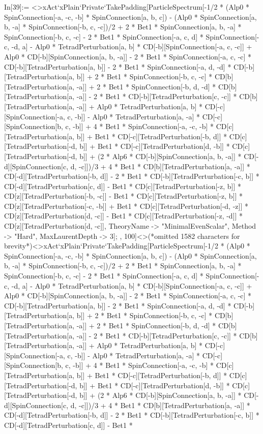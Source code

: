 In[39]:= <>xAct`xPlain`Private`TakePadding[ParticleSpectrum[-1/2 * (Alp0 * SpinConnection[-a, -c, -b] * SpinConnection[a, b, c]) - (Alp0 * SpinConnection[a, b, -a] * SpinConnection[-b, c, -c])/2 + 2 * Bet1 * SpinConnection[a, b, -a] * SpinConnection[-b, c, -c] - 2 * Bet1 * SpinConnection[-a, c, d] * SpinConnection[-c, -d, a] - Alp0 * TetradPerturbation[a, b] * CD[-b][SpinConnection[-a, c, -c]] + Alp0 * CD[-b][SpinConnection[a, b, -a]] - 2 * Bet1 * SpinConnection[-a, c, -c] * CD[-b][TetradPerturbation[a, b]] - 2 * Bet1 * SpinConnection[-a, d, -d] * CD[-b][TetradPerturbation[a, b]] + 2 * Bet1 * SpinConnection[-b, c, -c] * CD[b][TetradPerturbation[a, -a]] + 2 * Bet1 * SpinConnection[-b, d, -d] * CD[b][TetradPerturbation[a, -a]] - 2 * Bet1 * CD[-b][TetradPerturbation[c, -c]] * CD[b][TetradPerturbation[a, -a]] + Alp0 * TetradPerturbation[a, b] * CD[-c][SpinConnection[-a, c, -b]] - Alp0 * TetradPerturbation[a, -a] * CD[-c][SpinConnection[b, c, -b]] + 4 * Bet1 * SpinConnection[-a, -c, -b] * CD[c][TetradPerturbation[a, b]] + Bet1 * CD[-c][TetradPerturbation[-b, d]] * CD[c][TetradPerturbation[-d, b]] + Bet1 * CD[-c][TetradPerturbation[d, -b]] * CD[c][TetradPerturbation[-d, b]] + (2 * Alp6 * CD[-b][SpinConnection[a, b, -a]] * CD[-d][SpinConnection[c, d, -c]])/3 + 4 * Bet1 * CD[b][TetradPerturbation[a, -a]] * CD[-d][TetradPerturbation[-b, d]] - 2 * Bet1 * CD[-b][TetradPerturbation[-c, b]] * CD[-d][TetradPerturbation[c, d]] - Bet1 * CD[c][TetradPerturbation[-z, b]] * CD[z][TetradPerturbation[-b, -c]] - Bet1 * CD[c][TetradPerturbation[-z, b]] * CD[z][TetradPerturbation[-c, -b]] + Bet1 * CD[c][TetradPerturbation[-d, -z]] * CD[z][TetradPerturbation[d, -c]] - Bet1 * CD[c][TetradPerturbation[-z, -d]] * CD[z][TetradPerturbation[d, -c]], TheoryName -> "MinimalEvenScalar", Method -> "Hard", MaxLaurentDepth -> 3]; , 100]<>(*omitted 1582 characters for brevity*)<>xAct`xPlain`Private`TakePadding[ParticleSpectrum[-1/2 * (Alp0 * SpinConnection[-a, -c, -b] * SpinConnection[a, b, c]) - (Alp0 * SpinConnection[a, b, -a] * SpinConnection[-b, c, -c])/2 + 2 * Bet1 * SpinConnection[a, b, -a] * SpinConnection[-b, c, -c] - 2 * Bet1 * SpinConnection[-a, c, d] * SpinConnection[-c, -d, a] - Alp0 * TetradPerturbation[a, b] * CD[-b][SpinConnection[-a, c, -c]] + Alp0 * CD[-b][SpinConnection[a, b, -a]] - 2 * Bet1 * SpinConnection[-a, c, -c] * CD[-b][TetradPerturbation[a, b]] - 2 * Bet1 * SpinConnection[-a, d, -d] * CD[-b][TetradPerturbation[a, b]] + 2 * Bet1 * SpinConnection[-b, c, -c] * CD[b][TetradPerturbation[a, -a]] + 2 * Bet1 * SpinConnection[-b, d, -d] * CD[b][TetradPerturbation[a, -a]] - 2 * Bet1 * CD[-b][TetradPerturbation[c, -c]] * CD[b][TetradPerturbation[a, -a]] + Alp0 * TetradPerturbation[a, b] * CD[-c][SpinConnection[-a, c, -b]] - Alp0 * TetradPerturbation[a, -a] * CD[-c][SpinConnection[b, c, -b]] + 4 * Bet1 * SpinConnection[-a, -c, -b] * CD[c][TetradPerturbation[a, b]] + Bet1 * CD[-c][TetradPerturbation[-b, d]] * CD[c][TetradPerturbation[-d, b]] + Bet1 * CD[-c][TetradPerturbation[d, -b]] * CD[c][TetradPerturbation[-d, b]] + (2 * Alp6 * CD[-b][SpinConnection[a, b, -a]] * CD[-d][SpinConnection[c, d, -c]])/3 + 4 * Bet1 * CD[b][TetradPerturbation[a, -a]] * CD[-d][TetradPerturbation[-b, d]] - 2 * Bet1 * CD[-b][TetradPerturbation[-c, b]] * CD[-d][TetradPerturbation[c, d]] - Bet1 * 